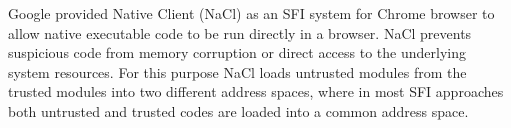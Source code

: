 
Google provided Native Client (NaCl) \cite{NaCl-09} as an SFI system for
Chrome browser to allow native executable code to be run directly in a
browser. NaCl prevents suspicious code
from memory corruption or direct access to the underlying system
resources. For this purpose NaCl loads untrusted modules from the
trusted modules into two different address spaces, where in most SFI
approaches both untrusted and trusted codes are loaded into a common
address space.

%
